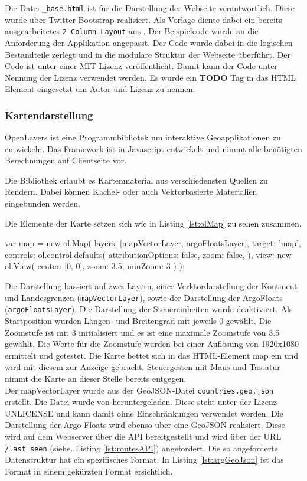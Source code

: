Die Datei \texttt{\_base.html} ist für die Darstellung der Webseite verantwortlich. Diese wurde über Twitter Bootstrap realisiert. Als Vorlage diente dabei ein bereits ausgearbeitetes  \texttt{2-Column Layout} aus \cite{Ng2014}. Der Beispielcode wurde an die Anforderung der Applikation angepasst. Der Code wurde dabei in die logischen Bestandteile zerlegt und in die modulare Struktur der Webseite überführt. Der Code ist unter einer MIT Lizenz veröffentlicht. Damit kann der Code unter Nennung der Lizenz verwendet werden. Es wurde ein \textbf{TODO} Tag in das HTML Element eingesetzt um Autor und Lizenz zu nennen.

\subsubsection{Kartendarstellung}

 OpenLayers ist eine Programmbibliotek um interaktive Geoapplikationen zu entwickeln. Das Framework ist in Javascript entwickelt und nimmt alle benötigten Berechnungen auf Clientseite vor.
    
    Die Bibliothek erlaubt es Kartenmaterial aus verschiedensten Quellen zu Rendern. Dabei können Kachel- oder auch Vektorbasierte Materialien eingebunden werden.

Die Elemente der Karte setzen sich wie in Listing \ref{lst:olMap} zu sehen zusammen.

\begin{javascript}[label={lst:olMap}, caption={Das ol.Map Element aus der Kartendarstellung}]
 var map = new ol.Map({
    layers: [mapVectorLayer, argoFloatsLayer],
    target: 'map',
    controls: ol.control.defaults({
        attributionOptions: false,
        zoom: false,
    }),
    view: new ol.View({
        center: [0, 0],
        zoom: 3.5,
        minZoom: 3
    })
});
\end{javascript}

Die Darstellung bassiert auf zwei Layern, einer Verktordarstellung der Kontinent- und Landesgrenzen (\texttt{mapVectorLayer}), sowie der Darstellung der ArgoFloats (\texttt{argoFloatsLayer}). Die Darstellung der Steuereinheiten wurde deaktiviert. Als Startposition wurden Längen- und Breitengrad mit jeweils 0 gewählt. Die Zoomstufe ist mit 3 initialisiert und es ist eine maximale Zoomstufe von 3.5 gewählt. Die Werte für die Zoomstufe wurden bei einer Auflösung von 1920x1080 ermittelt und getestet.
Die Karte bettet sich in das HTML-Element map ein und wird mit diesem zur Anzeige gebracht. Steuergesten mit Maus und Tastatur nimmt die Karte an dieser Stelle bereits entgegen.
\\
Der mapVectorLayer wurde aus der GeoJSON-Datei \texttt{countries.geo.json}  erstellt. Die Datei wurde von \cite{sundstrm16} heruntergeladen. Diese steht unter der Lizenz UNLICENSE und kann damit ohne Einschränkungen verwendet werden. Die Darstellung der Argo-Floats wird ebenso über eine GeoJSON realisiert. Diese wird auf dem Webserver über die API bereitgestellt und wird über der URL \texttt{/last\_seen} (siehe. Listing \ref{lst:routesAPI}) angefordert. Die so angeforderte Datenstruktur hat ein spezifisches Format. In Listing \ref{lst:argGeoJson} ist das Format in einem gekürzten Format ersichtlich. 

